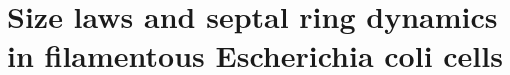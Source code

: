 

\chapter{Size laws and septal ring dynamics in filamentous Escherichia coli cells}
\label{chapter:filarecovery}


